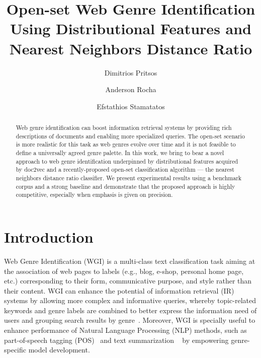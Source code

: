 \documentclass{llncs}
\begin{document}
\title{Open-set Web Genre Identification Using Distributional Features and Nearest Neighbors Distance Ratio}

\author{Dimitrios Pritsos \and Anderson Rocha \and Efstathios Stamatatos }


\maketitle

\begin{abstract}
Web genre identification can boost information retrieval systems by providing rich descriptions of documents and enabling more specialized queries. The open-set scenario is more realistic for this task as web genres evolve over time and it is not feasible to define a universally agreed genre palette. In this work, we bring to bear a novel approach to web genre identification underpinned by distributional features acquired by doc2vec and a recently-proposed open-set classification algorithm --- the nearest neighbors distance ratio classifier. We present experimental results using a benchmark corpus and a strong baseline and demonstrate that the proposed approach is highly competitive, especially when emphasis is given on precision.

\end{abstract}

\section{Introduction}\label{sec:intro}
Web Genre Identification (WGI) is a multi-class text classification task aiming at the association of web pages to labels (e.g., blog, e-shop, personal home page, etc.) corresponding to their form, communicative purpose, and style rather than their content. WGI can enhance the potential of information retrieval (IR) systems by allowing more complex and informative queries, whereby topic-related keywords and genre labels are combined to better express the information need of users and grouping search results by genre~\cite{Rosso2008,Malhotra:2017}. Moreover, WGI is specially useful to enhance performance of Natural Language Processing (NLP) methods, such as part-of-speech tagging (POS)~\cite{Nooralahzadeh2014} and text summarization ~\cite{Stewart:2009} by empowering genre-specific model development. 
\end{document}
